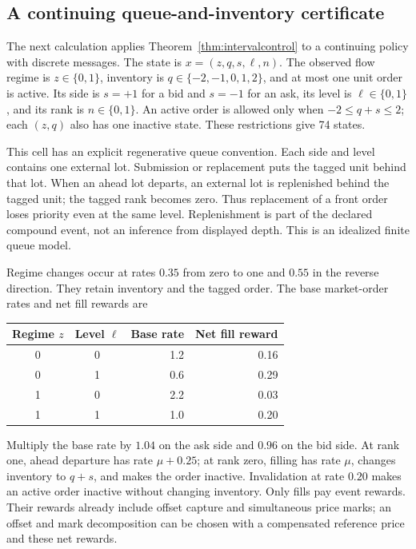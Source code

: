\documentclass[11pt]{article}
\theoremstyle{plain}
\theoremstyle{definition}
\theoremstyle{remark}
\begin{document}
\subsection{A continuing queue-and-inventory certificate}
\label{sec:intervalexample}

The next calculation applies Theorem~\ref{thm:intervalcontrol} to
a continuing policy with discrete messages. The state is
\(x=(z,q,s,\ell,n)\). The observed flow regime is \(z\in\{0,1\}\),
inventory is \(q\in\{-2,-1,0,1,2\}\), and at most one unit order
is active. Its side is \(s=+1\) for a bid and \(s=-1\) for an ask,
its level is \(\ell\in\{0,1\}\), and its rank is \(n\in\{0,1\}\).
An active order is allowed only when \(-2\le q+s\le2\);
each \((z,q)\) also has one inactive state. These restrictions
give 74 states.

This cell has an explicit regenerative queue convention. Each
side and level contains one external lot. Submission or replacement
puts the tagged unit behind that lot. When an ahead lot departs,
an external lot is replenished behind the tagged unit; the tagged
rank becomes zero. Thus replacement of a front order loses priority
even at the same level. Replenishment is part of the declared
compound event, not an inference from displayed depth. This is an
idealized finite queue model.

Regime changes occur at rates \(0.35\) from zero to one and
\(0.55\) in the reverse direction. They retain inventory and the
tagged order. The base market-order rates and net fill rewards are
\begin{center}
\begin{tabular}{@{}ccrr@{}}
\toprule
Regime \(z\)&Level \(\ell\)&Base rate&Net fill reward\\
\midrule
0&0&1.2&0.16\\
0&1&0.6&0.29\\
1&0&2.2&0.03\\
1&1&1.0&0.20\\
\bottomrule
\end{tabular}
\end{center}
Multiply the base rate by \(1.04\) on the ask side and \(0.96\)
on the bid side. At rank one, ahead departure has rate
\(\mu+0.25\); at rank zero, filling has rate \(\mu\), changes
inventory to \(q+s\), and makes the order inactive. Invalidation
at rate \(0.20\) makes an active order inactive without changing
inventory. Only fills pay event rewards. Their rewards already
include offset capture and simultaneous price marks; an offset
and mark decomposition can be chosen with a compensated reference
price and these net rewards.
\end{document}
